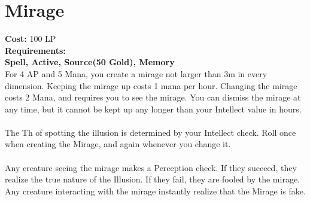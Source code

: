\section{Mirage}\label{spell:mirage}
\textbf{Cost:} 100 LP\\
\textbf{Requirements:}\\
\textbf{Spell, Active, Source(50 Gold), Memory}\\
For 4 AP and 5 Mana, you create a mirage not larger than 3m in every dimension.
Keeping the mirage up costs 1 mana per hour.
Changing the mirage costs 2 Mana, and requires you to see the mirage.
You can dismiss the mirage at any time, but it cannot be kept up any longer than your Intellect value in hours.\\
\\
The Th of spotting the illusion is determined by your Intellect check.
Roll once when creating the Mirage, and again whenever you change it. \\
\\
Any creature seeing the mirage makes a Perception check.
If they succeed, they realize the true nature of the Illusion.
If they fail, they are fooled by the mirage.
Any creature interacting with the mirage instantly realize that the Mirage is fake.\\
